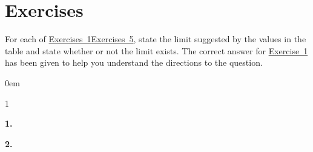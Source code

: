 \documentclass[12pt,]{book}
\theoremstyle{plain}
\theoremstyle{definition}
\numberwithin{equation}{section}
\newcommand{\hrulemedium}{\noalign{\hrule height 0.07em}}
\newcommand{\hrulethick} {\noalign{\hrule height 0.11em}}
\newcounter{figstack}
\newcounter{figindex}
\newlength\fight
\newcommand\pushValignCaptionBottom[5][b]{%
\stepcounter{figstack}%
\expandafter\def\csname %
figalign\romannumeral\value{figstack}\endcsname{#1}%
\expandafter\def\csname %
figtype\romannumeral\value{figstack}\endcsname{#2}%
\expandafter\def\csname %
figwd\romannumeral\value{figstack}\endcsname{#3}%
\expandafter\def\csname %
figcontent\romannumeral\value{figstack}\endcsname{#4}%
\expandafter\def\csname %
figcap\romannumeral\value{figstack}\endcsname{#5}%
\setbox0=\hbox{%
\begin{#2}{#3}#4\end{#2}}%
\ifdim\dimexpr\ht0+\dp0\relax>\fight\global\setlength{\fight}{%
\dimexpr\ht0+\dp0\relax}\fi%
}
\newcommand\popValignCaptionBottom{%
\setcounter{figindex}{0}%
\hfill%
\whiledo{\value{figindex}<\value{figstack}}{%
\stepcounter{figindex}%
\def\tmp{\csname figwd\romannumeral\value{figindex}\endcsname}%
\begin{\csname figtype\romannumeral\value{figindex}\endcsname}[t]{\tmp}%
\centering%
\stackinset{c}{}%
{\csname figalign\romannumeral\value{figindex}\endcsname}{}%
{\csname figcontent\romannumeral\value{figindex}\endcsname}%
{\rule{0pt}{\fight}}\par%
\csname figcap\romannumeral\value{figindex}\endcsname%
\end{\csname figtype\romannumeral\value{figindex}\endcsname}%
\hfill%
}%
\setcounter{figstack}{0}%
\setlength{\fight}{0pt}%
\hfill%
}
\newenvironment{exercisegroup}%
{\medskip\noindent}%
{\par\bigskip}%
\newlength{\exercisegroupindent}%
\newlength{\exercisegroupitemwidth}%
\newenvironment{exercisegrouplist}%
{\vspace{-\partopsep}%
\begin{adjustwidth}{\exercisegroupindent}{0em}}%
{\end{adjustwidth}%
\vspace{-\partopsep}%
\vspace{\baselineskip}}%
\newenvironment{exercisegroupbycol}[1]%
{\begin{exercisegrouplist}%
\vspace{-\multicolsep}%
\begin{multicols}{#1}%
\setlength{\parindent}{0em}%
\setlength{\exercisegroupitemwidth}{\linewidth}}%
{\end{multicols}%
\vspace{-\multicolsep}%
\end{exercisegrouplist}}%
\newenvironment{exercisegroupitem}[1]%
{\begin{minipage}[t]{\exercisegroupitemwidth}
\vspace{0pt}%
{\bfseries#1}%
\rule{0pt}{\baselineskip}}{\strut%
\end{minipage}%
\hspace{\columnsep}}%
\providecommand\phantomsection{}
\newcommand{\fe}[2]{\mathop{{#1}{\left(#2\right)}}}
\begin{document}
\section*{Exercises}\label{exercises-18}

\begin{exercisegroup}%
For each of \hyperref[exercise-limits-supplement-first]{Exercises~1}\textendash{}\hyperref[exercise-limits-supplement-last]{Exercises~5}, state the limit suggested by the values in the table and state whether or not the limit exists.  The correct answer for \hyperref[exercise-limits-supplement-first]{Exercise~1} has been given to help you understand the directions to the question.%
\par
\begin{exercisegroupbycol}{1}%
\begin{exercisegroupitem}{1. }\phantomsection\hypertarget{exercise-limits-supplement-first}{\null}
\end{exercisegroupitem}%
\par%
\begin{exercisegroupitem}{2. }\phantomsection\hypertarget{exercise-139}{\null}
\begin{figure}
\centering

\end{figure}
\end{exercisegroupitem}
\end{exercisegroupbycol}
\end{exercisegroup}
\end{document}
